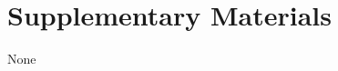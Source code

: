 \documentclass[11pt,openany,oneside]{book}
\begin{document}


\chapter{Supplementary Materials}  %

None


\backmatter


\end{document}
